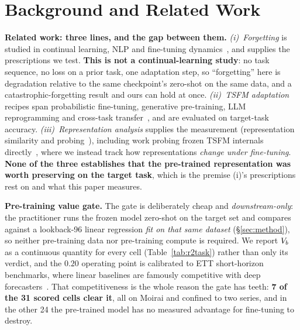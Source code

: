 \section{Background and Related Work}
\label{sec:background}

\textbf{Related work: three lines, and the gap between them.}
\emph{(i)~Forgetting} is studied in continual learning, NLP and fine-tuning
dynamics~\cite{kirkpatrick2017ewc, li2017lwf, luo2023forgetting,
kumar2022finetuning, andreassen2023evolution}, and supplies the prescriptions
we test.  \textbf{This is not a continual-learning study}: no task sequence, no
loss on a prior task, one adaptation step, so ``forgetting'' here is degradation
relative to the same checkpoint's zero-shot on the same data, and a
catastrophic-forgetting result and ours can hold at once.
\emph{(ii)~TSFM adaptation} recipes span probabilistic
fine-tuning, generative pre-training, LLM reprogramming and cross-task
transfer~\cite{rasul2024lagllama, liu2024timer, jin2024timellm,
zhou2023onefitsall}, and are evaluated on target-task accuracy.
\emph{(iii)~Representation analysis} supplies the measurement (representation
similarity and probing~\cite{kornblith2019cka, hewitt2019structural,
pimentel2020information}), including work probing frozen TSFM internals
directly~\cite{wilinski2025representations}, where we instead track how
representations \emph{change under fine-tuning}.  \textbf{None of the three
establishes that the pre-trained representation was worth preserving on the
target task}, which is the premise (i)'s prescriptions rest on and what this
paper measures.

\textbf{Pre-training value gate.}
The gate is deliberately cheap and \emph{downstream-only}: the practitioner
runs the frozen model zero-shot on the target set and compares against a
lookback-96 linear regression \emph{fit on that same dataset}
(\S\ref{sec:method}), so neither pre-training data nor pre-training compute is
required.  We report $V_{b}$ as a continuous quantity for every cell
(Table~\ref{tab:r2task}) rather than only its verdict, and the $0.20$ operating
point is calibrated to ETT short-horizon benchmarks, where linear
baselines are famously competitive with deep
forecasters~\cite{zeng2023transformers}.  That competitiveness is the whole
reason the gate has teeth: \textbf{7 of the 31 scored cells clear it}, all on
Moirai and confined to two series, and in the other 24 the pre-trained model
has no measured advantage for fine-tuning to destroy.

